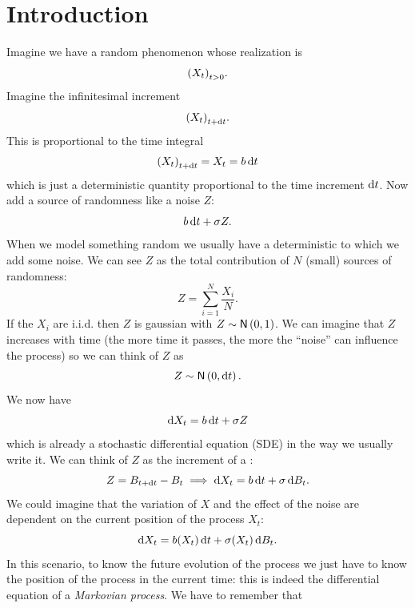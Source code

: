 \documentclass[12pt]{report}
\begin{document}
\section{Introduction}
Imagine we have a random phenomenon whose realization is 
\begin{equation*}
	{\left({X}_{t}\right)}_{t>0}.
\end{equation*}
Imagine the infinitesimal increment 
\begin{equation*}
	{\left({X}_{t}\right)}_{t+\mathop{}\!\mathrm{d} t}.
\end{equation*}
This is proportional to the time integral
\begin{equation*}
	{\left({X}_{t}\right)}_{t+\mathop{}\!\mathrm{d} t}=X_{t}=b\mathop{}\!\mathrm{d} t
\end{equation*}
which is just a deterministic quantity proportional to the time increment $\mathop{}\!\mathrm{d} t$. Now add a source of randomness like a noise \rv{} $Z$:
\begin{equation*}
	b\mathop{}\!\mathrm{d} t+\sigma Z.
\end{equation*}
When we model something random we usually have a deterministic to which we add some noise. We can see $Z$ as the total contribution of $N$ (small) sources of randomness:
\begin{equation*}
	Z=\sum_{i=1}^{N}\frac{X_{i}}{N}.
\end{equation*}
If the $X_{i}$ are i.i.d. then $Z$ is gaussian with $Z\sim\mathsf{N}\left(0,1\right)$. We can imagine that $Z$ increases with time (the more time it passes, the more the ``noise'' can influence the process) so we can think of $Z$ as 
\begin{equation*}
	Z\sim\mathsf{N}\left(0,\mathop{}\!\mathrm{d} t\right).
\end{equation*}
We now have 
\begin{equation*}
	\mathop{}\!\mathrm{d} X_{t}=b\mathop{}\!\mathrm{d} t+\sigma Z
\end{equation*}
which is already a stochastic differential equation (SDE) in the way we usually write it. We can think of $Z$ as the increment of a \bwm{}:
\begin{equation*}
	Z=B_{t+\mathop{}\!\mathrm{d} t}-B_{t}\implies \mathop{}\!\mathrm{d} X_{t}=b\mathop{}\!\mathrm{d} t+\sigma\mathop{}\!\mathrm{d} B_{t}.
\end{equation*}
We could imagine that the variation of $X$ and the effect of the noise are dependent on the current position of the process $X_{t}$:
\begin{equation*}
	\mathop{}\!\mathrm{d} X_{t}=b(X_{t})\mathop{}\!\mathrm{d} t+\sigma(X_{t})\mathop{}\!\mathrm{d} B_{t}.
\end{equation*}
In this scenario, to know the future evolution of the process we just have to know the position of the process in the current time: this is indeed the differential equation of a \emph{Markovian process}.
We have to remember that 
\end{document}
